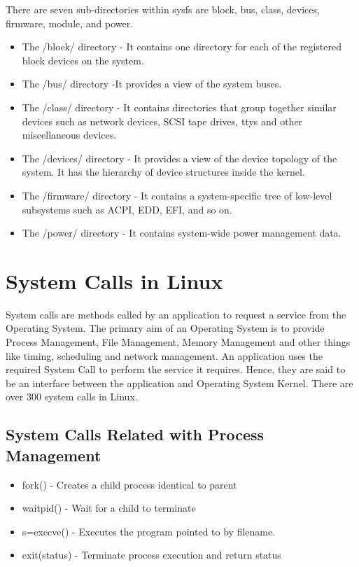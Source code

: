 \documentclass[12pt]{report}
\begin{document}
There are seven sub-directories within  sysfs are block, bus, class, devices, firmware, module, and power. 
\begin{itemize}
	\item The /block/ directory   - It contains one directory for each of the registered block devices on the system. 
	\item The /bus/ directory     -It provides a view of the system buses. 
	\item The /class/ directory   - It contains directories that group together similar devices such as network devices, SCSI tape drives, ttys and other miscellaneous devices.
	\item The /devices/ directory  - It provides a  view of the device topology of the system. It has the hierarchy of device structures inside the kernel.
	\item The /firmware/ directory - It contains a system-specific tree of low-level subsystems such as ACPI, EDD, EFI, and so on. 
	\item The /power/ directory          - It contains system-wide power management data.
\end{itemize}

\section{System Calls in Linux}

System calls are methods called by an application to request a service from the Operating System. The primary aim of an Operating System is to provide Process Management, File Management, Memory Management and other things like timing, scheduling and network management. An application uses the required System Call to perform the service it requires. Hence, they are said to be an interface between the application and Operating System Kernel. There are over 300 system calls in Linux.


\subsection{System Calls Related with Process Management}
\begin{itemize}
	\item fork()       - Creates a child process identical to parent 
	\item waitpid()    - Wait for a child to terminate
	\item s=execve()   - Executes the program pointed to by filename.
	\item exit(status) - Terminate process execution and return status   
	
\end{itemize}
\end{document}
